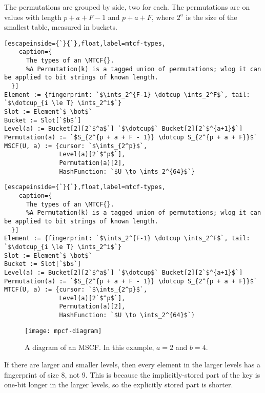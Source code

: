 \documentclass[letterpaper,twocolumn,10pt]{article}
\newcommand{\ints}{\mathbb{Z}}
\newcommand{\dotcup}{\ensuremath{\mathaccent\cdot\cup}}
\newcommand{\MTCF}{MSCF}
\newcommand{\MTCF}{MTCF}
\begin{document}
The permutations are grouped by side, two for each.
The permutations are on values with length $p + a + F - 1$ and $p + a + F$, where $2^a$ is the size of the smallest table, measured in buckets.

\ifanon
\begin{lstlisting}[escapeinside={`}{`},float,label=mtcf-types,
    caption={
      The types of an \MTCF{}.
      %A Permutation(k) is a tagged union of permutations; wlog it can be applied to bit strings of known length.
  }]
Element := {fingerprint: `$\ints_2^{F-1} \dotcup \ints_2^F$`, tail: `$\dotcup_{i \le T} \ints_2^i$`}
Slot := Element`$_\bot$`
Bucket := Slot[`$b$`]
Level(a) := Bucket[2][2`$^a$`] `$\dotcup$` Bucket[2][2`$^{a+1}$`]
Permutation(a) := `$S_{2^{p + a + F - 1}} \dotcup S_{2^{p + a + F}}$`
MSCF(U, a) := {cursor: `$\ints_{2^p}$`,
               Level(a)[2`$^p$`],
               Permutation(a)[2],
               HashFunction: `$U \to \ints_2^{64}$`}
\end{lstlisting}
\else
\begin{lstlisting}[escapeinside={`}{`},float,label=mtcf-types,
    caption={
      The types of an \MTCF{}.
      %A Permutation(k) is a tagged union of permutations; wlog it can be applied to bit strings of known length.
  }]
Element := {fingerprint: `$\ints_2^{F-1} \dotcup \ints_2^F$`, tail: `$\dotcup_{i \le T} \ints_2^i$`}
Slot := Element`$_\bot$`
Bucket := Slot[`$b$`]
Level(a) := Bucket[2][2`$^a$`] `$\dotcup$` Bucket[2][2`$^{a+1}$`]
Permutation(a) := `$S_{2^{p + a + F - 1}} \dotcup S_{2^{p + a + F}}$`
MTCF(U, a) := {cursor: `$\ints_{2^p}$`,
               Level(a)[2`$^p$`],
               Permutation(a)[2],
               HashFunction: `$U \to \ints_2^{64}$`}
\end{lstlisting}
\fi

\begin{figure}[b!]
  \texttt{[image: mpcf-diagram]}
\caption{\label{mtcf-diagram}
A diagram of an \MTCF{}.
In this example, $a = 2$ and $b=4$.
}
\end{figure}

If there are larger and smaller levels, then every element in the larger levels has a fingerprint of size 8, not 9.
This is because the implicitly-stored part of the key is one-bit longer in the larger levels, so the explicitly stored part is shorter.
\end{document}
